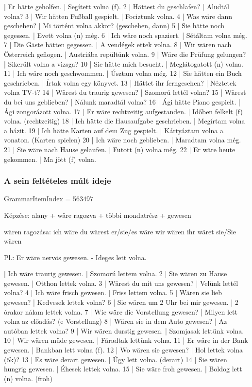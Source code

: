 \documentclass{article}
\newenvironment{desc}{\verbatim}{\endverbatim}
\newenvironment{exmp}{\verbatim}{\endverbatim}
\begin{document}
\begin{exmp}
1 | Er hätte geholfen. | Segített volna (f).
2 | Hättest du geschlafen? | Aludtál volna?
3 | Wir hätten Fußball gespielt. | Fociztunk volna.
4 | Was wäre dann geschehen? | Mi történt volna akkor? (geschehen, dann)
5 | Sie hätte noch gegessen. | Evett volna (n) még.
6 | Ich wäre noch spaziert. | Sétáltam volna még.
7 | Die Gäste hätten gegessen. | A vendégek ettek volna.
8 | Wir wären nach Österreich geflogen. | Austriába repültünk volna.
9 | Wäre die Prüfung gelungen? | Sikerült volna a vizsga?
10 | Sie hätte mich besucht. | Meglátogatott (n) volna.
11 | Ich wäre noch geschwommen. | Úsztam volna még.
12 | Sie hätten ein Buch geschrieben. | Írtak volna egy könyvet.
13 | Hättet ihr ferngesehen? | Néztetek volna TV-t?
14 | Wärest du traurig gewesen? | Szomorú lettél volna?
15 | Wärest du bei uns geblieben? | Nálunk maradtál volna?
16 | Ági hätte Piano gespielt. | Ági zongorázott volna.
17 | Er wäre rechtzeitig aufgestanden. | Időben felkelt (f) volna. (rechtzeitig)
18 | Ich hätte die Hausaufgabe geschrieben. | Megírtam volna a házit.
19 | Ich hätte Karten auf dem Zug gespielt. | Kártyáztam volna a vonaton. (Karten spielen)
20 | Ich wäre noch geblieben. | Maradtam volna még.
21 | Sie wäre nach Hause gelaufen. | Futott (n) volna még.
22 | Er wäre heute gekommen. | Ma jött (f) volna.
\end{exmp}

\subsubsection{A sein feltételes múlt ideje}

GrammarItemIndex = 563497

\begin{desc}
Képzése:
alany + wäre ragozva + többi mondatrész + gewesen

wären ragozása:
ich wäre
du wärest
er/sie/es wäre
wir wären
ihr wäret
sie/Sie wären

Pl.: Er wäre nervös gewesen. - Ideges lett volna.
\end{desc}

\begin{exmp}
1 | Ich wäre traurig gewesen. | Szomorú lettem volna.
2 | Sie wären zu Hause gewesen. | Otthon lettek volna.
3 | Wärest du mit uns gewesen? | Velünk lettél volna?
4 | Ich wäre frisch gewesen. | Friss lettem volna.
5 | Wären sie lieb gewesen? | Kedvesek lettek volna?
6 | Sie wären um 2 Uhr bei mir gewesen. | 2 órakor nálam lettek volna.
7 | Wie wäre die Vorstellung gewesen? | Milyen lett volna az előadás? (e Vorstellung)
8 | Wären sie in dem Auto gewesen? | Az autóban lettek volna?
9 | Wir wären durstig gewesen. | Szomjasak lettünk volna.
10 | Wir wären müde gewesen. | Fáradtak lettünk volna.
11 | Er wäre in der Bank gewesen. | Bankban lett volna (f).
12 | Wo wären sie gewesen? | Hol lettek volna (ők)?
13 | Es wäre derart gewesen. | Úgy lett volna. (derart)
14 | Sie wären hungrig gewesen. | Éhesek lettek volna.
15 | Sie wäre froh gewesen. | Boldog lett (n) volna. (froh)
\end{exmp}
\end{document}
